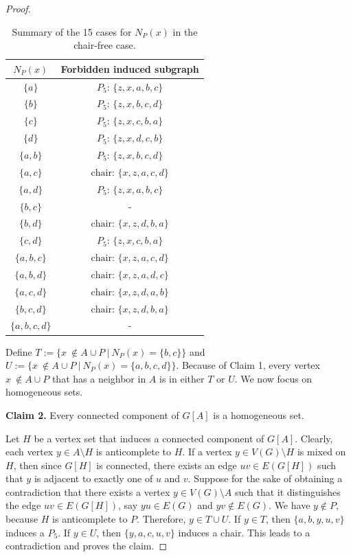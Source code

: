 \documentclass[10pt]{article}
\theoremstyle{definition}
\begin{document}
\begin{proof}
\begin{table}[h]
\centering
\begin{tabular}{c|c}
\hline
$N_P(x)$ & Forbidden induced subgraph \\
\hline
$\{a\}$ &  $P_5$: $\{z,x,a,b,c\}$\\
$\{b\}$ &  $P_5$: $\{z,x,b,c,d\}$\\
$\{c\}$ &  $P_5$: $\{z,x,c,b,a\}$\\
$\{d\}$ &  $P_5$: $\{z,x,d,c,b\}$\\
$\{a,b\}$ &  $P_5$: $\{z,x,b,c,d\}$\\
$\{a,c\}$ &  $\text{chair}$: $\{x,z,a,c,d\}$\\
$\{a,d\}$ &  $P_5$: $\{z,x,a,b,c\}$\\
$\{b,c\}$ &  -\\
$\{b,d\}$ &  $\text{chair}$: $\{x,z,d,b,a\}$\\
$\{c,d\}$ &  $P_5$: $\{z,x,c,b,a\}$\\
$\{a,b,c\}$ &  $\text{chair}$: $\{x,z,a,c,d\}$\\
$\{a,b,d\}$ &  $\text{chair}$: $\{x,z,a,d,c\}$\\
$\{a,c,d\}$ &  $\text{chair}$: $\{x,z,d,a,b\}$\\
$\{b,c,d\}$ &  $\text{chair}$: $\{x,z,d,b,a\}$\\
$\{a,b,c,d\}$ & -\\
\hline
\end{tabular}
\caption{Summary of the 15 cases for $N_P(x)$ in the chair-free case.}
\label{tab:PossibilitiesForNPx}
\end{table}

\bigskip

\noindent

Define $T := \{x~\notin A \cup P~|~N_P(x)=\{b,c\}\}$ and $U := \{x~\notin A \cup P~|~N_P(x)=\{a,b,c,d\}\}$. Because of Claim 1, every vertex $x~\notin A \cup P$ that has a neighbor in $A$ is in either $T$ or $U$. We now focus on homogeneous sets.

\noindent \textbf{Claim 2.} Every connected component of $G[A]$ is a homogeneous set.

\bigskip

Let $H$ be a vertex set that induces a connected component of $G[A]$. Clearly, each vertex $y \in A \setminus H$ is anticomplete to $H$. If a vertex $y\in V(G)\setminus H$ is mixed on $H$, then since $G[H]$
is connected, there exists an edge $uv\in E(G[H])$ such that $y$ is adjacent
to exactly one of $u$ and $v$. Suppose for the sake of obtaining a contradiction that there exists a vertex $y \in V(G) \setminus A$ such that it distinguishes the edge $uv \in E(G[H])$, say $yu \in E(G)$ and $yv \notin E(G)$. We have $y \notin P$, because $H$ is anticomplete to $P$. Therefore, $y \in T \cup U$. If $y \in T$, then $\{a,b,y,u,v\}$ induces a $P_5$. If $y \in U$, then $\{y,a,c,u,v\}$ induces a $\text{chair}$. This leads to a contradiction and proves the claim.


\end{proof}
\end{document}
